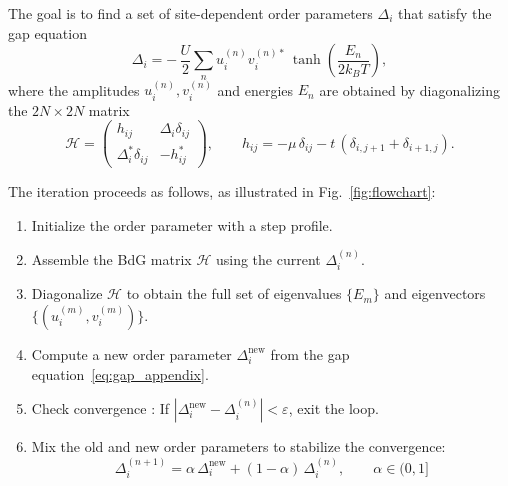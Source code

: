 \documentclass[11pt,a4paper,twoside,openany]{report}
\begin{document}
The goal is to find a set of site-dependent order parameters $\Delta_i$ that satisfy the gap equation
\begin{equation}
  \Delta_i = -\,\frac{U}{2}\sum_{n} u_{i}^{(n)} v_{i}^{(n)*}\,
            \tanh\!\left(\frac{E_{n}}{2k_{B}T}\right) ,
  \label{eq:gap_appendix}
\end{equation}
where the amplitudes $u_{i}^{(n)},v_{i}^{(n)}$ and energies $E_n$ are obtained by diagonalizing the $2N\times2N$ matrix
\begin{equation}
  \mathcal{H} =
  \begin{pmatrix}
    h_{ij} & \Delta_i\delta_{ij} \\
    \Delta_i^{*}\delta_{ij} & -h_{ij}^{*}
  \end{pmatrix},
  \qquad
  h_{ij}=-\mu\,\delta_{ij}-t\,(\delta_{i,j+1}+\delta_{i+1,j}) .
\end{equation}

The iteration proceeds as follows, as illustrated in Fig.~\ref{fig:flowchart}:

\begin{enumerate}
  \item Initialize the order parameter with a step profile.
  \item Assemble the BdG matrix $\mathcal{H}$ using the current $\Delta_i^{(n)}$.
  \item Diagonalize $\mathcal{H}$ to obtain the full set of eigenvalues $\{E_m\}$ and eigenvectors $\{(u_i^{(m)},v_i^{(m)})\}$.
  \item Compute a new order parameter $\Delta_i^{\text{new}}$ from the gap equation~\eqref{eq:gap_appendix}.
  \item Check convergence : If $|\Delta_i^{\text{new}}-\Delta_i^{(n)}|<\varepsilon$, exit the loop.
  \item Mix the old and new order parameters to stabilize the convergence:
    \[
      \Delta_i^{(n+1)} = \alpha\,\Delta_i^{\text{new}} + (1-\alpha)\,\Delta_i^{(n)} ,\qquad\alpha\in(0,1]
    \]
\end{enumerate}
\end{document}
